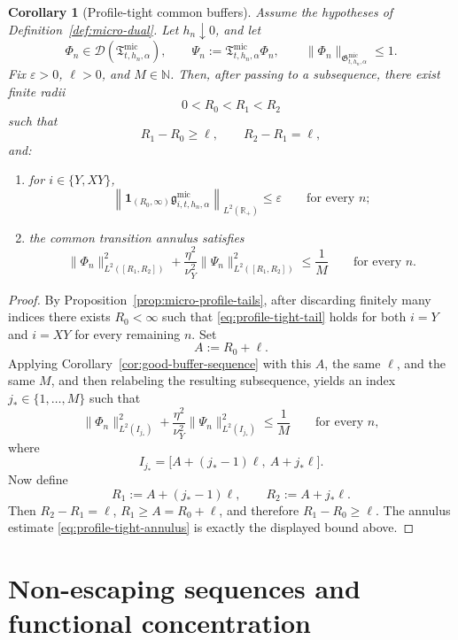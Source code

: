 \documentclass[11pt,a4paper]{amsart}
\theoremstyle{plain}
\newtheorem{corollary}[theorem]{Corollary}
\theoremstyle{definition}
\theoremstyle{remark}
\newcommand{\R}{\mathbb{R}}
\newcommand{\one}{\mathbf 1}
\begin{document}
\begin{corollary}[Profile-tight common buffers]
\label{cor:profile-tight-buffer}
Assume the hypotheses of Definition~\ref{def:micro-dual}. Let \(h_n\downarrow0\), and let
\[
\Phi_n\in\mathcal D(\mathfrak T_{t,h_n,\alpha}^{\mathrm{mic}}),
\qquad
\Psi_n:=\mathfrak T_{t,h_n,\alpha}^{\mathrm{mic}}\Phi_n,
\qquad
\|\Phi_n\|_{\mathfrak G_{t,h_n,\alpha}^{\mathrm{mic}}}\le1.
\]
Fix \(\varepsilon>0\), \(\ell>0\), and \(M\in\mathbb N\). Then, after passing to a subsequence,
there exist finite radii
\[
0<R_0<R_1<R_2
\]
such that
\[
R_1-R_0\ge \ell,
\qquad
R_2-R_1=\ell,
\]
and:
\begin{enumerate}[label=(\roman*)]
\item for \(i\in\{Y,XY\}\),
\begin{equation}\label{eq:profile-tight-tail}
\left\|
\one_{(R_0,\infty)}
\mathfrak g_{i,t,h_n,\alpha}^{\mathrm{mic}}
\right\|_{L^2(\R_+)}
\le
\varepsilon
\qquad\text{for every }n;
\end{equation}
\item the common transition annulus satisfies
\begin{equation}\label{eq:profile-tight-annulus}
\|\Phi_n\|_{L^2([R_1,R_2])}^2
+
\frac{\eta^2}{\nu_Y^2}
\|\Psi_n\|_{L^2([R_1,R_2])}^2
\le
\frac{1}{M}
\qquad\text{for every }n.
\end{equation}
\end{enumerate}
\end{corollary}

\begin{proof}
By Proposition~\ref{prop:micro-profile-tails}, after discarding finitely many indices there exists
\(R_0<\infty\) such that \eqref{eq:profile-tight-tail} holds for both \(i=Y\) and \(i=XY\) for every
remaining \(n\). Set
\[
A:=R_0+\ell.
\]
Applying Corollary~\ref{cor:good-buffer-sequence} with this \(A\), the same \(\ell\), and the same
\(M\), and then relabeling the resulting subsequence, yields an index \(j_*\in\{1,\dots,M\}\) such
that
\[
\|\Phi_n\|_{L^2(I_{j_*})}^2
+
\frac{\eta^2}{\nu_Y^2}
\|\Psi_n\|_{L^2(I_{j_*})}^2
\le
\frac{1}{M}
\qquad\text{for every }n,
\]
where
\[
I_{j_*}
=
\bigl[A+(j_*-1)\ell,\ A+j_*\ell\bigr].
\]
Now define
\[
R_1:=A+(j_*-1)\ell,
\qquad
R_2:=A+j_*\ell.
\]
Then \(R_2-R_1=\ell\), \(R_1\ge A=R_0+\ell\), and therefore \(R_1-R_0\ge\ell\). The annulus
estimate \eqref{eq:profile-tight-annulus} is exactly the displayed bound above.
\end{proof}

\section{Non-escaping sequences and functional concentration}
\label{sec:nonescaping}
\end{document}
